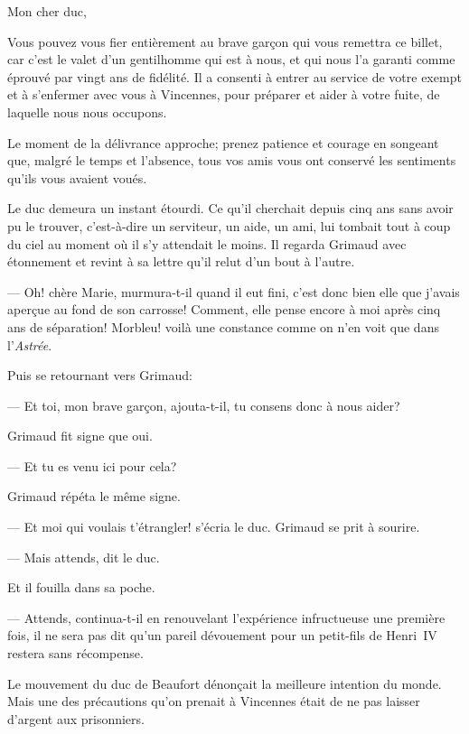 \begin{mail}{}{Mon cher duc,}

Vous pouvez vous fier entièrement au brave garçon qui vous remettra ce billet, car c'est le valet d'un gentilhomme qui est à nous, et qui nous l'a garanti comme éprouvé par vingt ans de fidélité. Il a consenti à entrer au service de votre exempt et à s'enfermer avec vous à Vincennes, pour préparer et aider à votre fuite, de laquelle nous nous occupons.

Le moment de la délivrance approche; prenez patience et courage en songeant que, malgré le temps et l'absence, tous vos amis vous ont conservé les sentiments qu'ils vous avaient voués.


\end{mail}

Le duc demeura un instant étourdi. Ce qu'il cherchait depuis cinq ans sans avoir pu le trouver, c'est-à-dire un serviteur, un aide, un ami, lui tombait tout à coup du ciel au moment où il s'y attendait le moins. Il regarda Grimaud avec étonnement et revint à sa lettre qu'il relut d'un bout à l'autre.

— Oh! chère Marie, murmura-t-il quand il eut fini, c'est donc bien elle que j'avais aperçue au fond de son carrosse! Comment, elle pense encore à moi après cinq ans de séparation! Morbleu! voilà une constance comme on n'en voit que dans l'\textit{Astrée}.

Puis se retournant vers Grimaud:

— Et toi, mon brave garçon, ajouta-t-il, tu consens donc à nous aider?

Grimaud fit signe que oui.

— Et tu es venu ici pour cela?

Grimaud répéta le même signe.

— Et moi qui voulais t'étrangler! s'écria le duc. Grimaud se prit à sourire.

— Mais attends, dit le duc.

Et il fouilla dans sa poche.

— Attends, continua-t-il en renouvelant l'expérience infructueuse une première fois, il ne sera pas dit qu'un pareil dévouement pour un petit-fils de Henri~IV restera sans récompense.

Le mouvement du duc de Beaufort dénonçait la meilleure intention du monde. Mais une des précautions qu'on prenait à Vincennes était de ne pas laisser d'argent aux prisonniers.

